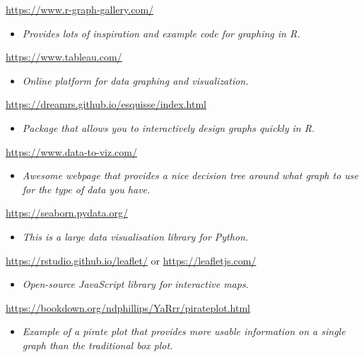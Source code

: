 \documentclass[
]{book}
\providecommand{\tightlist}{%
  \setlength{\itemsep}{0pt}\setlength{\parskip}{0pt}}
\begin{document}
\url{https://www.r-graph-gallery.com/}

\begin{itemize}
\tightlist
\item
  \emph{Provides lots of inspiration and example code for graphing in R.}
\end{itemize}

\url{https://www.tableau.com/}

\begin{itemize}
\tightlist
\item
  \emph{Online platform for data graphing and visualization.}
\end{itemize}

\url{https://dreamrs.github.io/esquisse/index.html}

\begin{itemize}
\tightlist
\item
  \emph{Package that allows you to interactively design graphs quickly in R.}
\end{itemize}

\url{https://www.data-to-viz.com/}

\begin{itemize}
\tightlist
\item
  \emph{Awesome webpage that provides a nice decision tree around what graph to use for the type of data you have.}
\end{itemize}

\url{https://seaborn.pydata.org/}

\begin{itemize}
\tightlist
\item
  \emph{This is a large data visualisation library for Python.}
\end{itemize}

\url{https://rstudio.github.io/leaflet/} or \url{https://leafletjs.com/}

\begin{itemize}
\tightlist
\item
  \emph{Open-source JavaScript library for interactive maps.}
\end{itemize}

\url{https://bookdown.org/ndphillips/YaRrr/pirateplot.html}

\begin{itemize}
\tightlist
\item
  \emph{Example of a pirate plot that provides more usable information on a single graph than the traditional box plot.}
\end{itemize}
\end{document}
